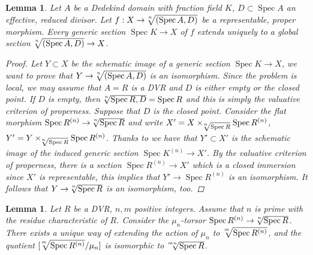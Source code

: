 \documentclass{amsart}
\numberwithin{equation}{section}
\numberwithin{subsection}{section}
\newtheorem{lemma}[theorem]{Lemma}
\theoremstyle{definition}
\theoremstyle{remark}
\newcommand\arr{\ifinner\to\else\longrightarrow\fi}
\newcommand\spec{\operatorname{Spec}}
\newcommand\radice[2][\relax]{\hspace{-1.5pt}\sqrt[\uproot{2}#1]{#2}}
\begin{document}
\begin{lemma}\label{easyval}
	Let $A$ be a Dedekind domain with fraction field $K$, $D\subset \spec A$ an effective, reduced divisor. Let $f:X \arr \radice[n]{(\spec A,D)}$ be a representable, proper morphism. Every generic section $\spec K\to X$ of $f$ extends uniquely to a global section $\radice[n]{(\spec A,D)}\to X$.
	\begin{proof}
		Let $Y\subset X$ be the schematic image of a generic section $\spec K\to X$, we want to prove that $Y \arr \radice[n]{(\spec A,D)}$ is an isomorphism. Since the problem is local, we may assume that $A=R$ is a DVR and $D$ is either empty or the closed point. If $D$ is empty, then $\radice[n]{\spec R,D}=\spec R$ and this is simply the valuative criterion of properness. Suppose that $D$ is the closed point. Consider the flat morphism $\spec R^{(n)} \arr \radice[n]{\spec R}$ and write $X'=X\times_{\radice[n]{\spec R}}\spec R^{(n)}$, $Y'=Y\times_{\radice[n]{\spec R}}\spec R^{(n)}$. Thanks to \cite[\href{https://stacks.math.columbia.edu/tag/0CMK}{Lemma 0CMK}]{stacks-project} we have that $Y'\subset X'$ is the schematic image of the induced generic section $\spec K^{(n)}\to X'$. By the valuative criterion of properness, there is a section $\spec R^{(n)}\to X'$ which is a closed immersion since $X'$ is representable, this implies that $Y'\to\spec R^{(n)}$ is an isomorphism. It follows that $Y \arr \radice[n]{\spec R}$ is an isomorphism, too.
	\end{proof}
\end{lemma}


\begin{lemma}
	Let $R$ be a DVR, $n,m$ positive integers. Assume that $n$ is prime with the residue characteristic of $R$. Consider the $\mu_{n}$-torsor $\spec R^{(n)}\to\radice[n]{\spec R}$. There exists a unique way of extending the action of $\mu_{n}$ to $\radice[m]{\spec R^{(n)}}$, and the quotient $[\radice[m]{\spec R^{(n)}}/\mu_{n}]$ is isomorphic to $\radice[mn]{\spec R}$.
\end{lemma}
\end{document}

